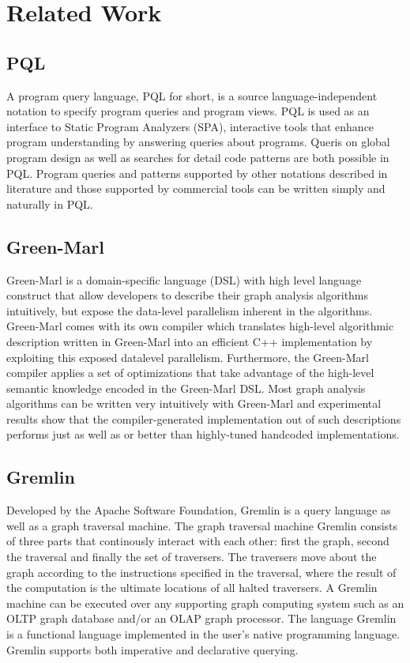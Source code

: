 \documentclass[11pt,singlecolumn]{scrartcl}
\begin{document}
\clearpage

\section{Related Work}


\subsection{PQL}
A program query language, PQL for short, is a source language-independent notation to specify program queries and program views. PQL is used as an interface to Static Program Analyzers (SPA), interactive tools that enhance program understanding by answering queries about programs. Queris on global program design as well as searches for detail code patterns are both possible in PQL. Program queries and patterns supported by other notations described in literature and those supported by commercial tools can be written simply and naturally in PQL.\cite {PQL}

\clearpage

\subsection{Green-Marl}
Green-Marl is a domain-specific language (DSL) with high level language construct that allow developers to describe their graph analysis algorithms intuitively, but expose the data-level parallelism inherent in the algorithms. Green-Marl comes with its own compiler which translates high-level algorithmic description written in Green-Marl into an efficient C++ implementation by exploiting this exposed datalevel parallelism. Furthermore, the Green-Marl compiler applies a set of optimizations that take advantage of the high-level semantic knowledge encoded in the Green-Marl DSL. Most graph analysis algorithms can be written very intuitively with Green-Marl and experimental results show that the compiler-generated implementation out of such descriptions performs just as well as or better than highly-tuned handcoded implementations.\cite {Greenmarl}

\clearpage

\subsection{Gremlin}
Developed by the Apache Software Foundation, Gremlin is a query language as well as a graph traversal machine. The graph traversal machine Gremlin consists of three parts that continously interact with each other: first the graph, second the traversal and finally the set of traversers. The traversers move about the graph according to the instructions specified in the traversal, where the result of the computation is the ultimate locations of all halted traversers. A Gremlin machine can be executed over any supporting graph computing system such as an OLTP graph database and/or an OLAP graph processor. The language Gremlin is a functional language implemented in the user’s native programming language. Gremlin supports both imperative and declarative querying.
\cite{Gremlin}
\end{document}
